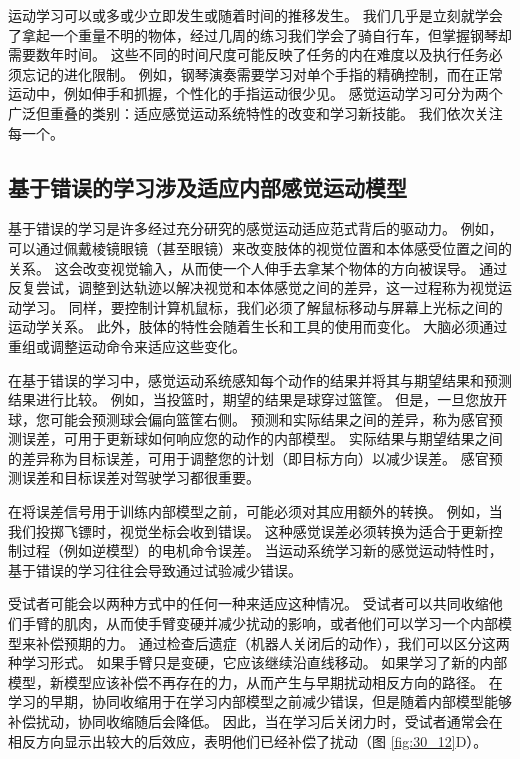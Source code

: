 运动学习可以或多或少立即发生或随着时间的推移发生。 我们几乎是立刻就学会了拿起一个重量不明的物体，经过几周的练习我们学会了骑自行车，但掌握钢琴却需要数年时间。 这些不同的时间尺度可能反映了任务的内在难度以及执行任务必须忘记的进化限制。 例如，钢琴演奏需要学习对单个手指的精确控制，而在正常运动中，例如伸手和抓握，个性化的手指运动很少见。 感觉运动学习可分为两个广泛但重叠的类别：适应感觉运动系统特性的改变和学习新技能。 我们依次关注每一个。

\subsection{基于错误的学习涉及适应内部感觉运动模型}
基于错误的学习是许多经过充分研究的感觉运动适应范式背后的驱动力。 例如，可以通过佩戴棱镜眼镜（甚至眼镜）来改变肢体的视觉位置和本体感受位置之间的关系。 这会改变视觉输入，从而使一个人伸手去拿某个物体的方向被误导。 通过反复尝试，调整到达轨迹以解决视觉和本体感觉之间的差异，这一过程称为视觉运动学习。 同样，要控制计算机鼠标，我们必须了解鼠标移动与屏幕上光标之间的运动学关系。 此外，肢体的特性会随着生长和工具的使用而变化。 大脑必须通过重组或调整运动命令来适应这些变化。

在基于错误的学习中，感觉运动系统感知每个动作的结果并将其与期望结果和预测结果进行比较。 例如，当投篮时，期望的结果是球穿过篮筐。 但是，一旦您放开球，您可能会预测球会偏向篮筐右侧。 预测和实际结果之间的差异，称为感官预测误差，可用于更新球如何响应您的动作的内部模型。 实际结果与期望结果之间的差异称为目标误差，可用于调整您的计划（即目标方向）以减少误差。 感官预测误差和目标误差对驾驶学习都很重要。

在将误差信号用于训练内部模型之前，可能必须对其应用额外的转换。 例如，当我们投掷飞镖时，视觉坐标会收到错误。 这种感觉误差必须转换为适合于更新控制过程（例如逆模型）的电机命令误差。 当运动系统学习新的感觉运动特性时，基于错误的学习往往会导致通过试验减少错误。

受试者可能会以两种方式中的任何一种来适应这种情况。 受试者可以共同收缩他们手臂的肌肉，从而使手臂变硬并减少扰动的影响，或者他们可以学习一个内部模型来补偿预期的力。 通过检查后遗症（机器人关闭后的动作），我们可以区分这两种学习形式。 如果手臂只是变硬，它应该继续沿直线移动。 如果学习了新的内部模型，新模型应该补偿不再存在的力，从而产生与早期扰动相反方向的路径。 在学习的早期，协同收缩用于在学习内部模型之前减少错误，但是随着内部模型能够补偿扰动，协同收缩随后会降低。
因此，当在学习后关闭力时，受试者通常会在相反方向显示出较大的后效应，表明他们已经补偿了扰动（图 \ref{fig:30_12}D）。

